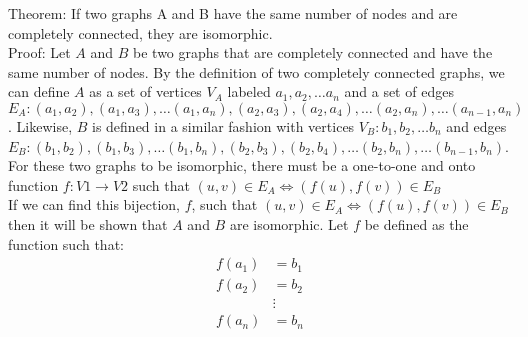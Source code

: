 \documentclass{article}
\begin{document}



Theorem: If two graphs A and B have the same number of nodes and are completely connected, they are isomorphic. \\

Proof: Let $A$ and $B$ be two graphs that are completely connected and have the same number of nodes. By the definition of two completely connected graphs, we can define $A$ as a set of vertices $V_A$ labeled $a_1, a_2, \hdots a_n$ and a set of edges $E_A : (a_1, a_2), (a_1, a_3), \hdots (a_1, a_n), (a_2, a_3), (a_2, a_4), \hdots (a_2, a_n), \hdots (a_{n-1}, a_n)$. Likewise, $B$ is defined in a similar fashion with vertices $V_B : b_1, b_2, \hdots b_n$ and edges $E_B : (b_1, b_2), (b_1, b_3), \hdots (b_1, b_n), (b_2, b_3), (b_2, b_4), \hdots (b_2, b_n), \hdots (b_{n-1}, b_n)$. For these two graphs to be isomorphic, there must be a one-to-one and onto function $f: V1 \rightarrow V2$ such that $(u, v) \in E_A \iff (f(u), f(v)) \in E_B$ \\

If we can find this bijection, $f$, such that $(u, v) \in E_A \iff (f(u), f(v)) \in E_B$ then it will be shown that $A$ and $B$ are isomorphic. Let $f$ be defined as the function such that:
\begin{align*}
    f(a_1) &= b_1 \\
    f(a_2) &= b_2 \\
    &\vdots \\
    f(a_n) &= b_n
\end{align*}
\end{document}
